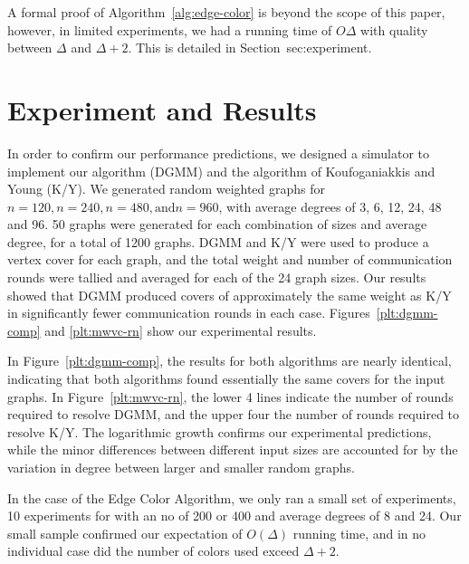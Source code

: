\documentclass[article, 10pt, letter]{IEEEtran}
\begin{document}
A formal proof of Algorithm~\ref{alg:edge-color} is beyond the scope of this paper, however, in limited experiments, we had a running time of $O{\Delta}$ with quality between $\Delta$ and $\Delta+2$. This is detailed in Section~{sec:experiment}.


\section{Experiment and Results}

In order to confirm our performance predictions, we designed a simulator to implement our algorithm (DGMM) and the algorithm of Koufoganiakkis and Young (K/Y). We generated random weighted graphs for $n=120, n=240, n=480, \text{and} n=960$, with average degrees of 3, 6, 12, 24, 48 and 96. 50 graphs were generated for each combination of sizes and average degree, for a total of 1200 graphs. DGMM and K/Y were used to produce a vertex cover for each graph, and the total weight and number of communication rounds were tallied and averaged for each of the 24 graph sizes. Our results showed that DGMM produced covers of approximately the same weight as K/Y in significantly fewer communication rounds in each case. Figures~\ref{plt:dgmm-comp} and \ref{plt:mwvc-rn} show our experimental results.




In Figure~\ref{plt:dgmm-comp}, the results for both algorithms are nearly identical, indicating that both algorithms found essentially the same covers for the input graphs. In Figure~\ref{plt:mwvc-rn}, the lower 4 lines indicate the number of rounds required to resolve DGMM, and the upper four the number of rounds required to resolve K/Y. The logarithmic growth confirms our experimental predictions, while the minor differences between different input sizes are accounted for by the variation in degree between larger and smaller random graphs.

In the case of the Edge Color Algorithm, we only ran a small set of experiments, 10 experiments for with an no of 200 or 400 and average degrees of 8 and 24. Our small sample confirmed our expectation of $O(\Delta)$ running time, and in no individual case did the number of colors used exceed $\Delta + 2$.


\end{document}
